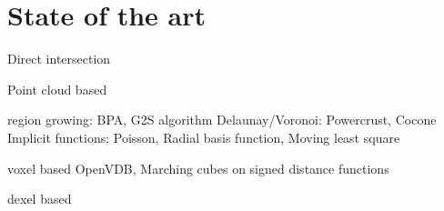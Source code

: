 
\chapter{State of the art}

Direct intersection

Point cloud based

region growing: BPA, G2S algorithm
Delaunay/Voronoi: Powercrust, Cocone
Implicit functions: Poisson, Radial basis function, Moving least square

voxel based
OpenVDB, Marching cubes on signed distance functions

dexel based
